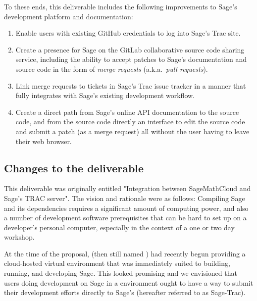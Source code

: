 To these ends, this deliverable includes the following improvements to Sage's
development platform and documentation:
\begin{enumerate}
\item Enable users with existing GitHub credentials to log into Sage's
    Trac site.
\item Create a presence for Sage on the GitLab collaborative source code
    sharing service, including the ability to accept patches to Sage's
    documentation and source code in the form of {\em merge requests}
    (a.k.a.~{\em pull requests}).
\item Link \GitLab merge requests to tickets in Sage's Trac issue tracker in
    a manner that fully integrates with Sage's existing development workflow.
\item Create a direct path from Sage's online API documentation to the source
    code, and from the source code directly an interface to edit the source
    code and submit a patch (as a merge request) all without the user having to
    leave their web browser.
\end{enumerate}



\hypertarget{changes-to-deliverable}{%
\subsection{Changes to the deliverable\label{changes-to-deliverable}}}


This deliverable was originally entitled "Integration between SageMathCloud and
Sage's TRAC server". The vision and rationale were as follows: Compiling Sage
and its dependencies requires a significant amount of computing power, and also
a number of development software prerequisites that can be hard to set up on a
developer's personal computer, especially in the context of a one or two day
workshop.

At the time of the proposal, \cocalc (then still named \SMC) had recently begun
providing a cloud-hosted virtual environment that was immediately suited to
building, running, and developing Sage. This looked promising and we envisioned
that users doing development on Sage in a \cocalc environment ought to have a
way to submit their development efforts directly to Sage's \Trac (hereafter
referred to as Sage-Trac).

